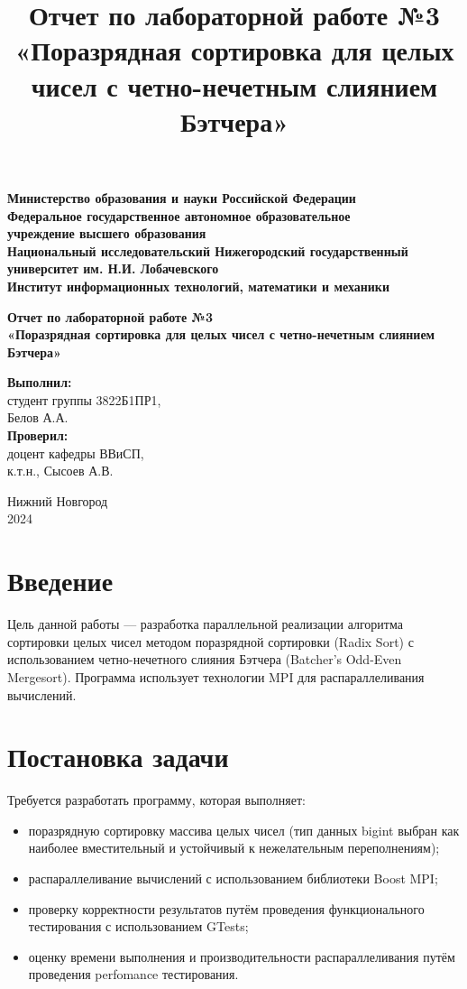 ﻿\documentclass[a4paper,12pt]{article}
\title{Отчет по лабораторной работе №3\\[5pt]
«Поразрядная сортировка для целых чисел с четно-нечетным слиянием Бэтчера»}
\author{}
\date{}
\begin{document}
\begin{titlepage}
    \centering
    \textbf{Министерство образования и науки Российской Федерации\\[5pt]
    Федеральное государственное автономное образовательное\\
    учреждение высшего образования\\
    Национальный исследовательский Нижегородский государственный университет им. Н.И. Лобачевского\\[10pt]
    Институт информационных технологий, математики и механики}\\[30pt]
    
    \vfill
    
    \textbf{\Large Отчет по лабораторной работе №3\\[10pt]
    «Поразрядная сортировка для целых чисел с четно-нечетным слиянием Бэтчера»}\\[50pt]
    
    \hfill\parbox{0.4\textwidth}{
        \textbf{Выполнил:}\\
        студент группы 3822Б1ПР1,\\
        Белов А.А.\\[10pt]
        \textbf{Проверил:}\\
        доцент кафедры ВВиСП,\\
        к.т.н., Сысоев А.В.\\
    }
    
    \vfill
    
    Нижний Новгород\\
    2024
\end{titlepage}

\section*{Введение}
Цель данной работы — разработка параллельной реализации алгоритма сортировки целых чисел методом поразрядной сортировки (Radix Sort) с использованием четно-нечетного слияния Бэтчера (Batcher's Odd-Even Mergesort). Программа использует технологии MPI для распараллеливания вычислений.

\section*{Постановка задачи}
Требуется разработать программу, которая выполняет:
\begin{itemize}
    \item поразрядную сортировку массива целых чисел (тип данных bigint выбран как наиболее вместительный и устойчивый к нежелательным переполнениям);
    \item распараллеливание вычислений с использованием библиотеки Boost MPI;
    \item проверку корректности результатов путём проведения функционального тестирования с использованием GTests;
    \item оценку времени выполнения и производительности распараллеливания путём проведения perfomance тестирования.
\end{itemize}
\end{document}
